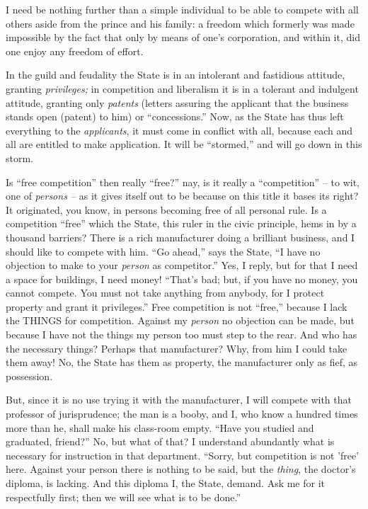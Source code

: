 I need be nothing further than a simple individual to be able to compete with 
all others aside from the prince and his family: a freedom which formerly was 
made impossible by the fact that only by means of one's corporation, and 
within it, did one enjoy any freedom of effort.

In the guild and feudality the State is in an intolerant and fastidious 
attitude, granting \textit{privileges;} in competition and liberalism it is in 
a tolerant and indulgent attitude, granting only \textit{patents} (letters 
assuring the applicant that the business stands open (patent) to him) or 
``concessions.'' Now, as the State has thus left everything to the 
\textit{applicants}, it must come in conflict with all, because each and all 
are entitled to make application. It will be ``stormed,'' and will go down 
in this storm.

Is ``free competition'' then really ``free?'' nay, is it really a 
``competition'' -- to wit, one of \textit{persons --} as it gives itself out 
to be because on this title it bases its right? It originated, you know, in 
persons becoming free of all personal rule. Is a competition ``free'' which 
the State, this ruler in the civic principle, hems in by a thousand barriers? 
There is a rich manufacturer doing a brilliant business, and I should like to 
compete with him. ``Go ahead,'' says the State, ``I have no objection to 
make to your \textit{person} as competitor.'' Yes, I reply, but for that I 
need a space for buildings, I need money! ``That's bad; but, if you have no 
money, you cannot compete. You must not take anything from anybody, for I 
protect property and grant it privileges.'' Free competition is not 
``free,'' because I lack the THINGS for competition. Against my 
\textit{person} no objection can be made, but because I have not the things my 
person too must step to the rear. And who has the necessary things? Perhaps 
that manufacturer? Why, from him I could take them away! No, the State has 
them as property, the manufacturer only as fief, as possession.

But, since it is no use trying it with the manufacturer, I will compete with 
that professor of jurisprudence; the man is a booby, and I, who know a hundred 
times more than he, shall make his class-room empty. ``Have you studied and 
graduated, friend?'' No, but what of that? I understand abundantly what is 
necessary for instruction in that department. ``Sorry, but competition is not 
'free' here. Against your person there is nothing to be said, but the 
\textit{thing}, the doctor's diploma, is lacking. And this diploma I, the 
State, demand. Ask me for it respectfully first; then we will see what is to 
be done.''

